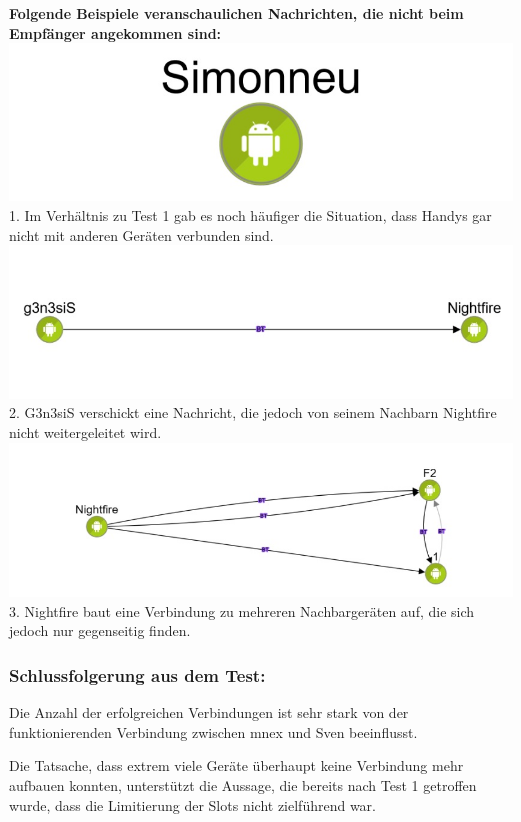 \textbf{Folgende Beispiele veranschaulichen Nachrichten, die nicht beim
Empfänger angekommen sind:}
\includegraphics[width=1.0\textwidth]{belege/grosstests/Bilder/Grosstest2/Test2Misserfolg1.jpg}
1. Im Verhältnis zu Test 1 gab es noch häufiger die Situation, dass Handys
gar nicht mit anderen Geräten verbunden sind.
\includegraphics[width=1.0\textwidth]{belege/grosstests/Bilder/Grosstest2/Test2Misserfolg2.jpg}
2. G3n3siS verschickt eine Nachricht, die jedoch von seinem Nachbarn
Nightfire nicht weitergeleitet wird.
\includegraphics[width=1.0\textwidth]{belege/grosstests/Bilder/Grosstest2/Test2Misserfolg3.jpg}
3. Nightfire baut eine Verbindung zu mehreren Nachbargeräten auf, die sich
jedoch nur gegenseitig finden.

\subsubsection{Schlussfolgerung aus dem
Test:}\label{schlussfolgerung-aus-dem-test-3}

Die Anzahl der erfolgreichen Verbindungen ist sehr stark von der
funktionierenden Verbindung zwischen mnex und Sven beeinflusst.

Die Tatsache, dass extrem viele Geräte überhaupt keine Verbindung mehr
aufbauen konnten, unterstützt die Aussage, die bereits nach Test 1
getroffen wurde, dass die Limitierung der Slots nicht zielführend war.

